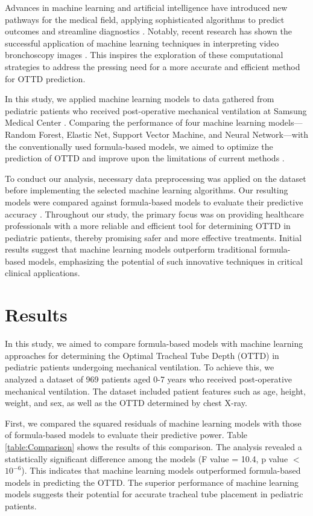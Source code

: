 \documentclass[11pt]{article}
\begin{document}
Advances in machine learning and artificial intelligence have introduced new pathways for the medical field, applying sophisticated algorithms to predict outcomes and streamline diagnostics \cite{Kitabatake2005ECHOCARDIOGRAPHVDOPPLERNE}. Notably, recent research has shown the successful application of machine learning techniques in interpreting video bronchoscopy images \cite{Yoo2021DeepLF}. This inspires the exploration of these computational strategies to address the pressing need for a more accurate and efficient method for OTTD prediction.

In this study, we applied machine learning models to data gathered from pediatric patients who received post-operative mechanical ventilation at Samsung Medical Center \cite{Rost2022TrachealTM}. Comparing the performance of four machine learning models—Random Forest, Elastic Net, Support Vector Machine, and Neural Network—with the conventionally used formula-based models, we aimed to optimize the prediction of OTTD and improve upon the limitations of current methods \cite{Mariano2005ACO, Simmons-Duffin2017ASD}.

To conduct our analysis, necessary data preprocessing was applied on the dataset before implementing the selected machine learning algorithms. Our resulting models were compared against formula-based models to evaluate their predictive accuracy \cite{Simmons-Duffin2017ASD}. Throughout our study, the primary focus was on providing healthcare professionals with a more reliable and efficient tool for determining OTTD in pediatric patients, thereby promising safer and more effective treatments. Initial results suggest that machine learning models outperform traditional formula-based models, emphasizing the potential of such innovative techniques in critical clinical applications.

\section*{Results}

In this study, we aimed to compare formula-based models with machine learning approaches for determining the Optimal Tracheal Tube Depth (OTTD) in pediatric patients undergoing mechanical ventilation. To achieve this, we analyzed a dataset of 969 patients aged 0-7 years who received post-operative mechanical ventilation. The dataset included patient features such as age, height, weight, and sex, as well as the OTTD determined by chest X-ray.

First, we compared the squared residuals of machine learning models with those of formula-based models to evaluate their predictive power. Table {}\ref{table:Comparison} shows the results of this comparison. The analysis revealed a statistically significant difference among the models (F value = 10.4, p value $<$ $10^{-6}$). This indicates that machine learning models outperformed formula-based models in predicting the OTTD. The superior performance of machine learning models suggests their potential for accurate tracheal tube placement in pediatric patients.
\end{document}
